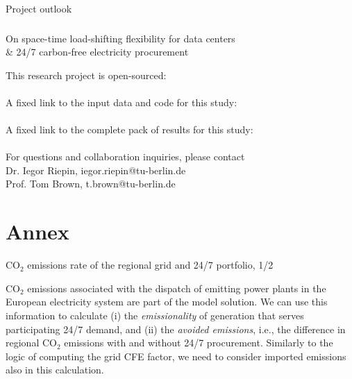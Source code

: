 {\begin{frame}{Project outlook}
\end{frame}



\begin{frame}\frametitle{\quad}

  {\Large
  \alert{On space-time load-shifting flexibility for data centers \\ 
  \& 24/7 carbon-free electricity procurement}
  }

  \vspace{.3cm}
  This research project is open-sourced: \\
  \faGithub~ \\
  A fixed link to the input data and code for this study: \\
  \faLink~ \\
  A fixed link to the complete pack of results for this study: \\
  \faLink~ \\

  \vspace{.3cm}
  For questions and collaboration inquiries, please contact \\
  Dr. Iegor Riepin, iegor.riepin@tu-berlin.de \\
  Prof. Tom Brown, t.brown@tu-berlin.de

\end{frame}


\section*{Annex}

\begin{frame}{CO$_2$ emissions rate of the regional grid and 24/7 portfolio, 1/2}

  {\small

  \alert{CO$_2$ emissions} associated with the dispatch of emitting power plants 
  in the European electricity system are part of the model solution.
  We can use this information to calculate (i) the \emph{emissionality} of generation 
  that serves participating 24/7 demand, and (ii) the \emph{avoided emissions}, i.e.,
  the difference in regional CO$_2$ emissions with and without 24/7 procurement. 
  Similarly to the logic of computing the grid CFE factor, 
  we need to consider imported emissions also in this calculation.
  
}
\end{frame}}
